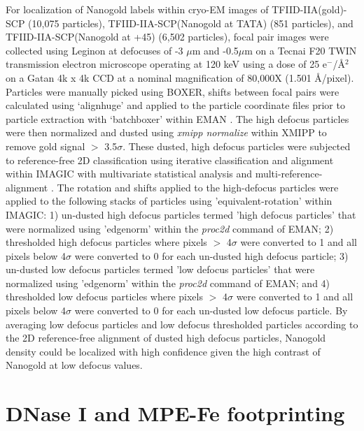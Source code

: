 For localization of Nanogold labels within cryo-EM images of TFIID-IIA(gold)-SCP (10,075 particles), TFIID-IIA-SCP(Nanogold at TATA) (851 particles), and TFIID-IIA-SCP(Nanogold at +45) (6,502 particles), focal pair images were collected using Leginon \cite{Suloway_1311} at defocuses of -3 $\mu$m and -0.5$\mu$m on a Tecnai F20 TWIN transmission electron microscope operating at 120 keV using a dose of 25 e$^{-}$/\AA$^{2}$ on a Gatan 4k x 4k CCD at a nominal magnification of 80,000X (1.501 \AA/pixel).  Particles were manually picked using BOXER, shifts between focal pairs were calculated using ‘alignhuge’ and applied to the particle coordinate files prior to particle extraction with ‘batchboxer’ within EMAN \cite{Ludtke_2307}.  The high defocus particles were then normalized and dusted using \emph{xmipp normalize} within XMIPP \cite{Sorzano_1492} to remove gold signal $>$ 3.5$\sigma$. These dusted, high defocus particles were subjected to reference-free 2D classification using iterative classification and alignment within IMAGIC with multivariate statistical analysis and multi-reference-alignment \cite{va_2849}. The rotation and shifts applied to the high-defocus particles were applied to the following stacks of particles using 'equivalent-rotation' within IMAGIC:  1) un-dusted high defocus particles termed 'high defocus particles' that were normalized using 'edgenorm' within the \emph{proc2d} command of EMAN; 2) thresholded high defocus particles where pixels $>$ 4$\sigma$ were converted to 1 and all pixels below 4$\sigma$ were converted to 0 for each un-dusted high defocus particle; 3) un-dusted low defocus particles termed 'low defocus particles' that were normalized using 'edgenorm' within the \emph{proc2d} command of EMAN; and 4) thresholded low defocus particles where pixels $>$ 4$\sigma$ were converted to 1 and all pixels below 4$\sigma$ were converted to 0 for each un-dusted low defocus particle.  By averaging low defocus particles and low defocus thresholded particles according to the 2D reference-free alignment of dusted high defocus particles, Nanogold density could be localized with high confidence given the high contrast of Nanogold at low defocus values.

\section{DNase I and MPE-Fe footprinting}

